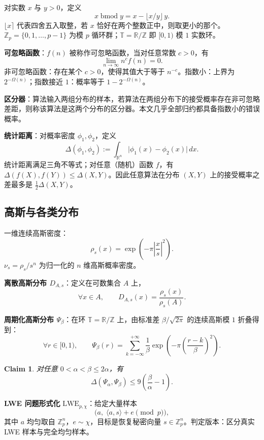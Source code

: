 \documentclass[11pt,a4paper]{article}
\newtheorem{claim}[theorem]{Claim}
\newcommand{\bmodop}{\operatorname{bmod}}
\newcommand{\T}{\mathbb{T}}
\newcommand{\R}{\mathbb{R}}
\newcommand{\Z}{\mathbb{Z}}
\begin{document}
对实数 $x$ 与 $y>0$，定义
\[
  x\bmodop y = x-\lfloor x/y\rfloor\,y.
\]
$\lfloor x\rceil$ 代表四舍五入取整，若 $x$ 恰好在两个整数正中，则取更小的那个。$\Z_{p}=\{0,1,\dots,p-1\}$ 为模 $p$ 循环群；$\T=\R/\Z$ 即 $[0,1)$ 模 $1$ 实数环。

\textbf{可忽略函数}：$f(n)$ 被称作可忽略函数，当对任意常数 $c>0$，有
\[
  \lim_{n\to\infty} n^{c}f(n)=0.
\]
非可忽略函数：存在某个 $c>0$，使得其值大于等于 $n^{-c}$。指数小：上界为 $2^{-\Omega(n)}$；指数接近 $1$：概率等于 $1-2^{-\Omega(n)}$。

\textbf{区分器}：算法输入两组分布的样本，若算法在两组分布下的接受概率存在非可忽略差距，则称该算法是这两个分布的区分器。本文几乎全部归约都具备指数小的错误概率。

\textbf{统计距离}：对概率密度 $\phi_{1},\phi_{2}$，定义
\[
  \Delta(\phi_{1},\phi_{2}):=\int_{\R^{n}}\bigl|\phi_{1}(x)-\phi_{2}(x)\bigr|\,dx.
\]
统计距离满足三角不等式；对任意（随机）函数 $f$，有 $\Delta(f(X),f(Y))\le \Delta(X,Y)$。因此任意算法在分布 $(X,Y)$ 上的接受概率之差最多是 $\frac{1}{2}\Delta(X,Y)$。

\subsection{高斯与各类分布}

一维连续高斯密度：
\[
  \rho_{s}(x)=\exp\!\left(-\pi\left|\frac{x}{s}\right|^{2}\right).
\]
$\nu_{s}=\rho_{s}/s^{n}$ 为归一化的 $n$ 维高斯概率密度。

\textbf{离散高斯分布 $D_{A,s}$}：定义在可数集合 $A$ 上，
\[
  \forall x\in A,\qquad D_{A,s}(x)=\frac{\rho_{s}(x)}{\rho_{s}(A)}.
\]

\textbf{周期化高斯分布 $\Psi_{\beta}$}：在环 $\T=\R/\Z$ 上，由标准差 $\beta/\sqrt{2\pi}$ 的连续高斯模 $1$ 折叠得到：
\[
  \forall r\in[0,1),\qquad
  \Psi_{\beta}(r)=\sum_{k=-\infty}^{+\infty}\frac{1}{\beta}
  \exp\!\left(-\pi\left(\frac{r-k}{\beta}\right)^{2}\right).
\]

\setcounter{theorem}{1} %
\begin{claim}
对任意 $0<\alpha<\beta\le 2\alpha$，有
\[
  \Delta(\Psi_{\alpha},\Psi_{\beta})\le 9\left(\frac{\beta}{\alpha}-1\right).
\]
\end{claim}

\textbf{LWE 问题形式化} $\mathrm{LWE}_{p,\chi}$：给定大量样本
\[
  \bigl(a,\;\langle a,s\rangle+e\pmod{p}\bigr),
\]
其中 $a$ 均匀取自 $\Z_{p}^{n}$，$e\sim\chi$，目标是恢复秘密向量 $s\in\Z_{p}^{n}$。判定版本：区分真实 LWE 样本与完全均匀样本。
\end{document}
